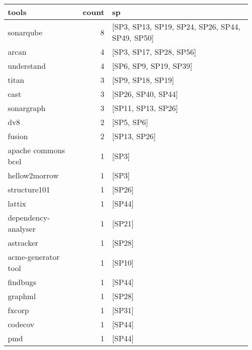 \begin{tabular}{lrl}
\toprule
               tools &  count &                                               sp \\
\midrule
           sonarqube &      8 &  [SP3, SP13, SP19, SP24, SP26, SP44, SP49, SP50] \\
               arcan &      4 &                          [SP3, SP17, SP28, SP56] \\
          understand &      4 &                           [SP6, SP9, SP19, SP39] \\
               titan &      3 &                                [SP9, SP18, SP19] \\
                cast &      3 &                               [SP26, SP40, SP44] \\
          sonargraph &      3 &                               [SP11, SP13, SP26] \\
                 dv8 &      2 &                                       [SP5, SP6] \\
              fusion &      2 &                                     [SP13, SP26] \\
 apache commons bcel &      1 &                                            [SP3] \\
       hellow2morrow &      1 &                                            [SP3] \\
        structure101 &      1 &                                           [SP26] \\
              lattix &      1 &                                           [SP44] \\
 dependency-analyser &      1 &                                           [SP21] \\
           astracker &      1 &                                           [SP28] \\
 acme-generator tool &      1 &                                           [SP10] \\
            findbugs &      1 &                                           [SP44] \\
             graphml &      1 &                                           [SP28] \\
              fxcorp &      1 &                                           [SP31] \\
             codecov &      1 &                                           [SP44] \\
                 pmd &      1 &                                           [SP44] \\

\end{tabular}
